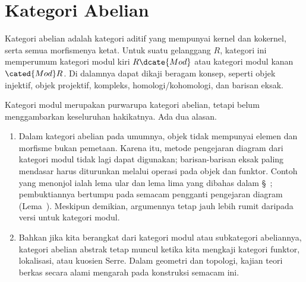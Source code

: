 
\chapter{Kategori Abelian}\label{sec:Abel-cat}
\hypertarget{o014.aljabr2.chapter2.overview}{ }

Kategori abelian adalah kategori aditif yang mempunyai kernel dan kokernel,
serta semua morfismenya ketat. Untuk suatu gelanggang $R$, kategori ini
memperumum kategori modul kiri $R\dcate{Mod}$ atau kategori modul kanan
$\cated{Mod}R$. Di dalamnya dapat dikaji beragam konsep, seperti objek
injektif, objek projektif, kompleks, homologi/kohomologi, dan barisan eksak.

Kategori modul merupakan purwarupa kategori abelian, tetapi belum menggambarkan
keseluruhan hakikatnya. Ada dua alasan.
\begin{enumerate}
	\item Dalam kategori abelian pada umumnya, objek tidak mempunyai elemen dan
	morfisme bukan pemetaan. Karena itu, metode pengejaran diagram dari kategori
	modul tidak lagi dapat digunakan; barisan-barisan eksak paling mendasar
	harus diturunkan melalui operasi pada objek dan funktor. Contoh yang
	menonjol ialah lema ular dan lema lima yang dibahas dalam
	\S~; pembuktiannya bertumpu pada
	semacam pengganti pengejaran diagram
	(Lema~). Meskipun
	demikian, argumennya tetap jauh lebih rumit daripada versi untuk kategori
	modul.

	\item Bahkan jika kita berangkat dari kategori modul atau subkategori
	abeliannya, kategori abelian abstrak tetap muncul ketika kita mengkaji
	kategori funktor, lokalisasi, atau kuosien Serre. Dalam geometri dan
	topologi, kajian teori berkas secara alami mengarah pada konstruksi semacam
	ini.
\end{enumerate}


